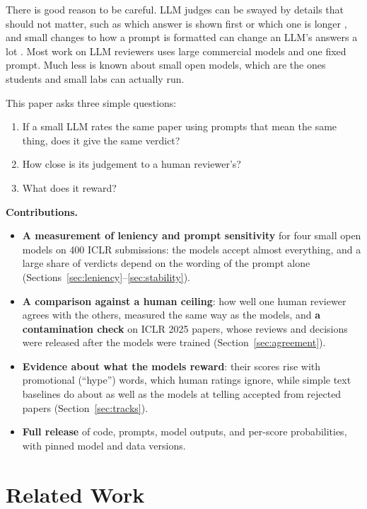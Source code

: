 \documentclass[11pt]{article}
\begin{document}
There is good reason to be careful. LLM judges can be swayed by details that should not matter, such as which answer is shown first or which one is longer \citep{zheng2023judging}, and small changes to how a prompt is formatted can change an LLM's answers a lot \citep{sclar2023quantifying, mizrahi2024state}. Most work on LLM reviewers uses large commercial models and one fixed prompt. Much less is known about small open models, which are the ones students and small labs can actually run.

This paper asks three simple questions:
\begin{enumerate}
  \item If a small LLM rates the same paper using prompts that mean the same thing, does it give the same verdict?
  \item How close is its judgement to a human reviewer's?
  \item What does it reward?
\end{enumerate}

\textbf{Contributions.}
\begin{itemize}
  \item \textbf{A measurement of leniency and prompt sensitivity} for four small open models on 400 ICLR submissions: the models accept almost everything, and a large share of verdicts depend on the wording of the prompt alone (Sections~\ref{sec:leniency}--\ref{sec:stability}).
  \item \textbf{A comparison against a human ceiling}: how well one human reviewer agrees with the others, measured the same way as the models, and \textbf{a contamination check} on ICLR 2025 papers, whose reviews and decisions were released after the models were trained (Section~\ref{sec:agreement}).
  \item \textbf{Evidence about what the models reward}: their scores rise with promotional (``hype'') words, which human ratings ignore, while simple text baselines do about as well as the models at telling accepted from rejected papers (Section~\ref{sec:tracks}).
  \item \textbf{Full release} of code, prompts, model outputs, and per-score probabilities, with pinned model and data versions.
\end{itemize}

\section{Related Work}
\end{document}

